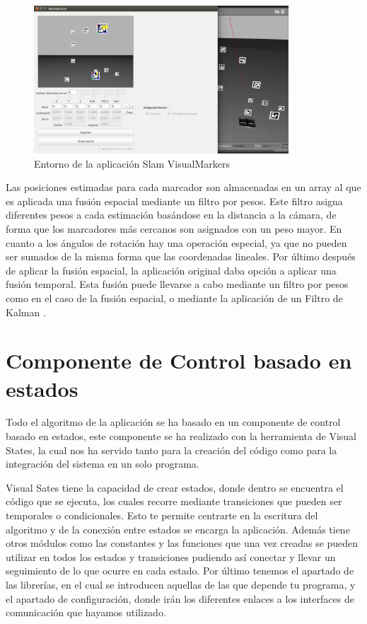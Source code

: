 \begin{figure}[H]
	\begin{center}
		\includegraphics[width=0.85\textwidth]{imag/IMG35.png}
				\caption{Entorno de la aplicación Slam VisualMarkers}
		\label{fig:Ejemplo Slam VisualMarkers.}	
	\end{center}
\end{figure}

\hspace{1cm} Las posiciones estimadas para cada marcador son almacenadas en un array al que es aplicada una fusión espacial mediante un filtro por pesos. Este filtro asigna diferentes pesos a cada estimación basándose en la distancia a la cámara, de forma que los marcadores más cercanos son asignados con un peso mayor. En cuanto a los ángulos de rotación hay una operación especial, ya que no pueden ser sumados de la misma forma que las coordenadas lineales. Por último después de aplicar la fusión espacial, la aplicación original daba opción a aplicar una fusión temporal.  Esta fusión puede llevarse a cabo mediante un filtro por pesos como en el caso de la fusión espacial, o mediante la aplicación de un Filtro de Kalman \cite{FiltroKalman}.

\section{Componente de Control basado en estados}
\hspace{1cm} Todo el algoritmo de la aplicación se ha basado en un componente de control basado en estados, este componente se ha realizado con la herramienta de Visual States, la cual nos ha servido tanto para la creación del código como para la integración del sistema en un solo programa. 

\hspace{1cm} Visual Sates tiene la capacidad de crear estados, donde dentro se encuentra el código que se ejecuta, los cuales recorre mediante transiciones que pueden ser temporales o condicionales. Esto te permite centrarte en la escritura del algoritmo y de la conexión entre estados se encarga la aplicación. Además tiene otros módulos como las constantes y las funciones que una vez creadas se pueden utilizar en todos los estados y transiciones pudiendo así conectar y llevar un seguimiento de lo que ocurre en cada estado. Por último tenemos el apartado de las librerías, en el cual se introducen aquellas de las que depende tu programa, y el apartado de configuración, donde irán los diferentes enlaces a los interfaces de comunicación que hayamos utilizado. 

